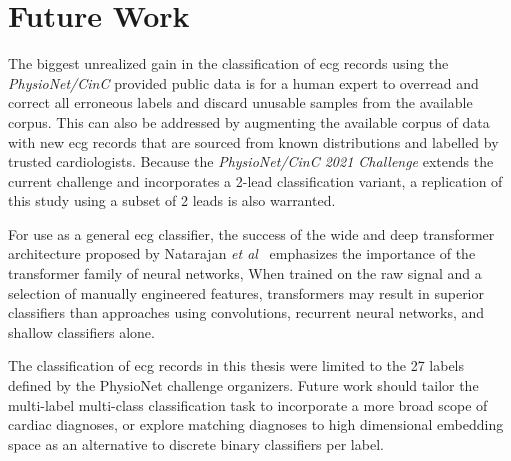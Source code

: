 \documentclass[\main/thesis.tex]{subfiles}
\begin{document}
\section{Future Work}
The biggest unrealized gain in the classification of \gls{ecg} records using the \emph{PhysioNet/CinC} provided public data is for a human expert to overread and correct all erroneous labels and discard unusable samples from the available corpus.
This can also be addressed by augmenting the available corpus of data with new \gls{ecg} records that are sourced from known distributions and labelled by trusted cardiologists.
Because the \emph{PhysioNet/CinC 2021 Challenge} extends the current challenge and incorporates a 2-lead classification variant, a replication of this study using a subset of 2 leads is also warranted.

For use as a general \gls{ecg} classifier, the success of the wide and deep transformer architecture proposed by Natarajan \emph{et al}~\cite{natarajan2020CINC-multilabel-ECG} emphasizes the importance of the transformer family of neural networks,
When trained on the raw signal and a selection of manually engineered features, transformers may result in superior classifiers than approaches using convolutions, recurrent neural networks, and shallow classifiers alone.

The classification of \gls{ecg} records in this thesis were limited to the 27 labels defined by the PhysioNet challenge organizers.
Future work should tailor the multi-label multi-class classification task to incorporate a more broad scope of cardiac diagnoses, or explore matching diagnoses to high dimensional embedding space as an alternative to discrete binary classifiers per label.
\end{document}
